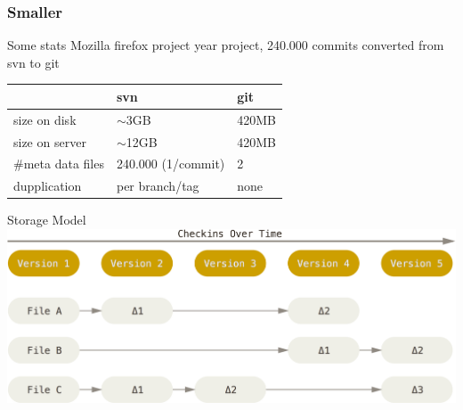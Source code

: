 \begin{frame}
\frametitle{Smaller}
\begin{block}{Some stats}
		Mozilla firefox project  year project, 240.000 commits \newline
		converted from svn to git \newline \newline
		\begin{tabular}{l | l | l}
			 & svn & git \\
			\hline
			size on disk & $\sim$3GB & 420MB \\
			size on server & $\sim$12GB & 420MB \\
			\#meta data files & 240.000 (1/commit) & 2 \\
			dupplication & per branch/tag & none \\
		\end{tabular}
	\end{block}
\end{frame}

\begin{frame}
	\begin{block}{Storage Model}
		\includegraphics[width=\textwidth]{./images/deltaStorage.png}
	\end{block}
\end{frame}
